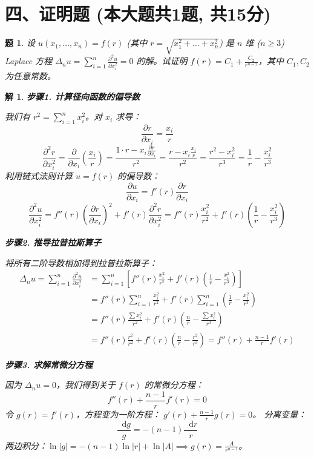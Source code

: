 \documentclass[12pt,a4paper]{article}
\newcommand{\diff}{\mathop{}\!\mathrm{d}}  %
\newtheorem{problem}{题}
\newtheorem*{solution}{解}
\begin{document}
	\section*{四、证明题 (本大题共1题, 共15分)}
	\begin{problem}
		设 $u(x_1, \dots, x_n) = f(r)$ (其中 $r = \sqrt{x_1^2 + \dots + x_n^2}$) 是 $n$ 维 ($n \geq 3$) Laplace 方程 $\Delta_n u = \sum_{i=1}^n \frac{\partial^2 u}{\partial x_i^2} = 0$ 的解。试证明 $f(r) = C_1 + \frac{C_2}{r^{n-2}}$，其中 $C_1, C_2$ 为任意常数。
	\end{problem}
	\hrulefill
	\begin{solution}
		\textbf{步骤1. 计算径向函数的偏导数}
		
		\noindent
		我们有 $r^2 = \sum_{i=1}^n x_i^2$。对 $x_i$ 求导：
		\[
		\frac{\partial r}{\partial x_i} = \frac{x_i}{r}
		\]
		\[
		\frac{\partial^2 r}{\partial x_i^2} = \frac{\partial}{\partial x_i}\left(\frac{x_i}{r}\right) = \frac{1 \cdot r - x_i \frac{\partial r}{\partial x_i}}{r^2} = \frac{r - x_i \frac{x_i}{r}}{r^2} = \frac{r^2 - x_i^2}{r^3} = \frac{1}{r} - \frac{x_i^2}{r^3}
		\]
		利用链式法则计算 $u=f(r)$ 的偏导数：
		\[
		\frac{\partial u}{\partial x_i} = f'(r) \frac{\partial r}{\partial x_i}
		\]
		\[
		\frac{\partial^2 u}{\partial x_i^2} = f''(r)\left(\frac{\partial r}{\partial x_i}\right)^2 + f'(r)\frac{\partial^2 r}{\partial x_i^2} = f''(r)\frac{x_i^2}{r^2} + f'(r)\left(\frac{1}{r} - \frac{x_i^2}{r^3}\right)
		\]
		
		\hrulefill
		
		\textbf{步骤2. 推导拉普拉斯算子}
		
		\noindent
		将所有二阶导数相加得到拉普拉斯算子：
		\begin{align*}
			\Delta_n u = \sum_{i=1}^n \frac{\partial^2 u}{\partial x_i^2} &= \sum_{i=1}^n \left[ f''(r)\frac{x_i^2}{r^2} + f'(r)\left(\frac{1}{r} - \frac{x_i^2}{r^3}\right) \right] \\
			&= f''(r) \sum_{i=1}^n \frac{x_i^2}{r^2} + f'(r) \sum_{i=1}^n \left(\frac{1}{r} - \frac{x_i^2}{r^3}\right) \\
			&= f''(r) \frac{\sum x_i^2}{r^2} + f'(r) \left(\frac{n}{r} - \frac{\sum x_i^2}{r^3}\right) \\
			&= f''(r) \frac{r^2}{r^2} + f'(r) \left(\frac{n}{r} - \frac{r^2}{r^3}\right) = f''(r) + \frac{n-1}{r} f'(r)
		\end{align*}
		
		\hrulefill
		
		\textbf{步骤3. 求解常微分方程}
		
		\noindent
		因为 $\Delta_n u = 0$，我们得到关于 $f(r)$ 的常微分方程：
		\[ f''(r) + \frac{n-1}{r} f'(r) = 0 \]
		令 $g(r) = f'(r)$，方程变为一阶方程： $g'(r) + \frac{n-1}{r} g(r) = 0$。
		分离变量：
		\[ \frac{\diff g}{g} = -(n-1) \frac{\diff r}{r} \]
		两边积分：$\ln|g| = -(n-1)\ln|r| + \ln|A| \implies g(r) = \frac{A}{r^{n-1}}$。
		

\end{solution}
\end{document}
